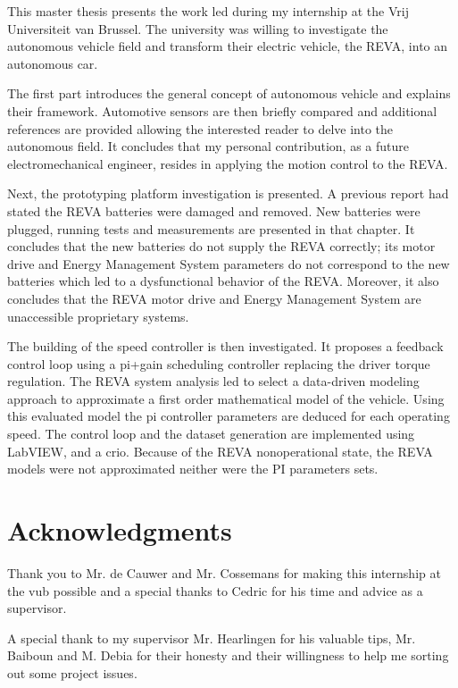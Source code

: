 This master thesis presents the work led during my internship at the Vrij Universiteit van Brussel. The university was willing to investigate the autonomous vehicle field and transform their electric vehicle, the REVA, into an autonomous car. 

The first part introduces the general concept of autonomous vehicle and explains their framework. Automotive sensors are then briefly compared and additional references are provided allowing the interested reader to delve into the autonomous field. It concludes that my personal contribution, as a future electromechanical engineer, resides in applying the motion control to the REVA. 

Next, the prototyping platform investigation is presented. A previous report had stated the REVA batteries were damaged and removed. New batteries were plugged, running tests and measurements are presented in that chapter. It concludes that the new batteries do not supply the REVA correctly; its motor drive and Energy Management System parameters do not correspond to the new batteries which led to a dysfunctional behavior of the REVA. Moreover, it also concludes that the REVA motor drive and Energy Management System are unaccessible proprietary systems. 

The building of the speed controller is then investigated. It proposes a feedback control loop using a \acs{pi}+gain scheduling controller replacing the driver torque regulation. The REVA system analysis led to select a data-driven modeling approach to approximate a first order mathematical model of the vehicle. Using this evaluated model the \acs{pi} controller parameters are deduced for each operating speed. The control loop and the dataset generation are implemented using LabVIEW, and a \acs{crio}. Because of the REVA nonoperational state, the REVA models were not approximated neither were the PI parameters sets. 

\chapter*{Acknowledgments}%
%

Thank you to Mr. de Cauwer and Mr. Cossemans for making this internship at the \acs{vub} possible and a special thanks to Cedric for his time and advice as a supervisor. 

A special thank to my supervisor Mr. Hearlingen for his valuable tips, Mr. Baiboun and M. Debia for their honesty and their willingness to help me sorting out some project issues.  

